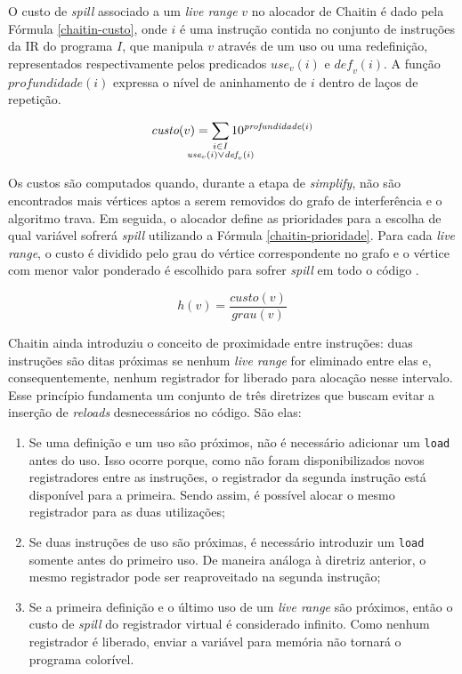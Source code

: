 \documentclass[
	12pt,				%
	openright,			%
	oneside,			%
	a4paper,			%
	tccpreliminar,			%
	]{ABNT-DC-UEL}
\begin{document}
O custo de \textit{spill} associado a um \textit{live range} $v$ no alocador de Chaitin é dado pela Fórmula \ref{chaitin-custo}, onde $i$ é uma instrução contida no conjunto de instruções da IR do programa $I$, que manipula $v$ através de um uso ou uma redefinição, representados respectivamente pelos predicados $\mathit{use}_v(i)$ e $\mathit{def}_v(i)$. A função $\mathit{profundidade} (i)$ expressa o nível de aninhamento de $i$ dentro de laços de repetição. 

\begin{equation}
    \textit{custo}(v) = \sum_{\mathclap{\substack{i \in I\\\textit{use}_v(i) \lor \textit{def}_v(i)}}} 10 ^ {\textit{profundidade}(i)}
    \label{chaitin-custo}
\end{equation}

Os custos são computados quando, durante a etapa de \textit{simplify}, não são encontrados mais vértices aptos a serem removidos do grafo de interferência e o algoritmo trava. Em seguida, o alocador define as prioridades para a escolha de qual variável sofrerá \textit{spill} utilizando a Fórmula \ref{chaitin-prioridade}. Para cada \textit{live range}, o custo é dividido pelo grau do vértice correspondente no grafo e o vértice com menor valor ponderado é escolhido para sofrer \textit{spill} em todo o código \cite{bernstein:89}.

\begin{equation}
    h(v) = \frac{\textit{custo}(v)}{\textit{grau}(v)}
    \label{chaitin-prioridade}
\end{equation}

Chaitin \cite{chaitin:82} ainda introduziu o conceito de proximidade entre instruções: duas instruções são ditas próximas se nenhum \textit{live range} for eliminado entre elas e, consequentemente, nenhum registrador for liberado para alocação nesse intervalo. Esse princípio fundamenta um conjunto de três diretrizes que buscam evitar a inserção de \textit{reloads} desnecessários no código. São elas:
\begin{enumerate}
    \item Se uma definição e um uso são próximos, não é necessário adicionar um \texttt{load} antes do uso. Isso ocorre porque, como não foram disponibilizados novos registradores entre as instruções, o registrador da segunda instrução está disponível para a primeira. Sendo assim, é possível alocar o mesmo registrador para as duas utilizações;
    \item Se duas instruções de uso são próximas, é necessário introduzir um \texttt{load} somente antes do primeiro uso. De maneira análoga à diretriz anterior, o mesmo registrador pode ser reaproveitado na segunda instrução;
    \item Se a primeira definição e o último uso de um \textit{live range} são próximos, então o custo de \textit{spill} do registrador virtual é considerado infinito. Como nenhum registrador é liberado, enviar a variável para memória não tornará o programa colorível.
\end{enumerate}
    
\end{document}
